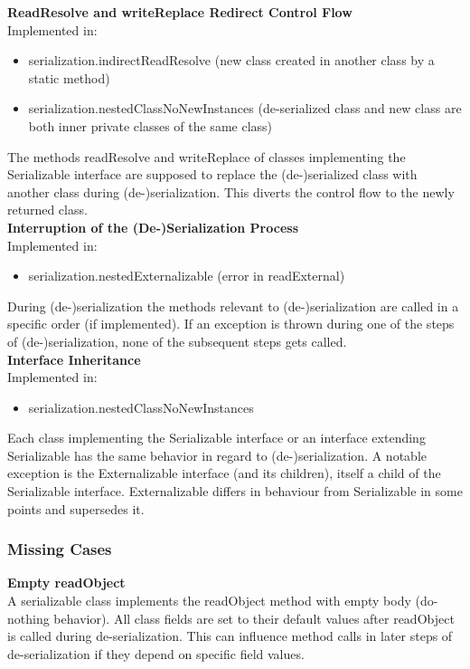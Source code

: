 \documentclass{article}
\begin{document}
\noindent
\textbf{ReadResolve and writeReplace Redirect Control Flow}\\
Implemented in: 
\begin{itemize}
    \item serialization.indirectReadResolve (new class created in another class by a static method)
    \item serialization.nestedClassNoNewInstances (de-serialized class and new class are both inner private classes of the same class)
\end{itemize}
The methods readResolve and writeReplace of classes implementing the Serializable interface are supposed to replace the (de-)serialized class with another class during (de-)serialization. This diverts the control flow to the newly returned class.\\

\noindent
\textbf{Interruption of the (De-)Serialization Process}\\
Implemented in: 
\begin{itemize}
    \item serialization.nestedExternalizable (error in readExternal)
\end{itemize}
During (de-)serialization the methods relevant to (de-)serialization are called in a specific order (if implemented). If an exception is thrown during one of the steps of (de-)serialization, none of the subsequent steps gets called.\\

\noindent
\textbf{Interface Inheritance}\\
Implemented in: 
\begin{itemize}
    \item serialization.nestedClassNoNewInstances
\end{itemize}
Each class implementing the Serializable interface or an interface extending Serializable has the same behavior in regard to (de-)serialization. A notable exception is the Externalizable interface (and its children), itself a child of the Serializable interface. Externalizable differs in behaviour from Serializable in some points and supersedes it.\\


\subsubsection{Missing Cases}

\textbf{Empty readObject}\\
A serializable class implements the readObject method with empty body (do-nothing behavior). All class fields are set to their default values after readObject is called during de-serialization. This can influence method calls in later steps of de-serialization if they depend on specific field values.\\
\end{document}
